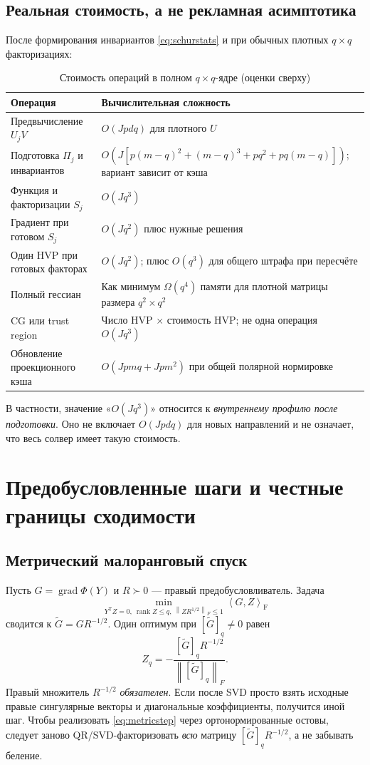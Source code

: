 \documentclass[10.5pt,a4paper]{article}
\newcommand{\T}{^{\mathsf T}}
\newcommand{\norm}[1]{\left\|#1\right\|}
\newcommand{\inn}[2]{\left\langle #1,#2\right\rangle_{\mathrm F}}
\DeclareMathOperator{\rank}{rank}
\DeclareMathOperator{\grad}{grad}
\numberwithin{equation}{section}
\theoremstyle{plain}
\theoremstyle{definition}
\begin{document}
\subsection{Реальная стоимость, а не рекламная асимптотика}
После формирования инвариантов \eqref{eq:schurstats} и при обычных плотных $q\times q$ факторизациях:
\begin{table}[ht]
\centering\small
\caption{Стоимость операций в полном $q\times q$-ядре (оценки сверху)}
\begin{tabularx}{\linewidth}{@{}L P{48mm}@{}}\toprule
Операция & Вычислительная сложность\\\midrule
Предвычисление $U_jV$ & $O(Jpdq)$ для плотного $U$\\
Подготовка $\Pi_j$ и инвариантов & $O(J[p(m-q)^2+(m-q)^3+pq^2+pq(m-q)])$; вариант зависит от кэша\\
Функция и факторизации $S_j$ & $O(Jq^3)$\\
Градиент при готовом $S_j$ & $O(Jq^2)$ плюс нужные решения\\
Один HVP при готовых факторах & $O(Jq^2)$; плюс $O(q^3)$ для общего штрафа при пересчёте\\
Полный гессиан & Как минимум $\Omega(q^4)$ памяти для плотной матрицы размера $q^2\times q^2$\\
CG или trust region & Число HVP $\times$ стоимость HVP; не одна операция $O(Jq^3)$\\
Обновление проекционного кэша & $O(Jpmq+Jpm^2)$ при общей полярной нормировке\\
\bottomrule\end{tabularx}
\label{tab:costs}
\end{table}
В частности, значение «$O(Jq^3)$» относится к \emph{внутреннему профилю после подготовки}. Оно не включает $O(Jpdq)$ для новых направлений и не означает, что весь солвер имеет такую стоимость.

\section{Предобусловленные шаги и честные границы сходимости}
\subsection{Метрический малоранговый спуск}
Пусть $G=\grad\Phi(Y)$ и $R\succ0$ --- правый предобусловливатель. Задача
\begin{equation}
 \min_{Y\T Z=0,\ \rank Z\le q,\ \norm{ZR^{1/2}}_F\le1}\inn{G}{Z}
 \label{eq:metric}
\end{equation}
сводится к $\widetilde G=GR^{-1/2}$. Один оптимум при $[\widetilde G]_q\ne0$ равен
\begin{equation}
 Z_q=-\frac{[\widetilde G]_q R^{-1/2}}{\norm{[\widetilde G]_q}_F}.
 \label{eq:metricstep}
\end{equation}
Правый множитель $R^{-1/2}$ \emph{обязателен}. Если после SVD просто взять исходные правые сингулярные векторы и диагональные коэффициенты, получится иной шаг. Чтобы реализовать \eqref{eq:metricstep} через ортонормированные остовы, следует заново QR/SVD-факторизовать \emph{всю} матрицу $[\widetilde G]_qR^{-1/2}$, а не забывать беление.
\end{document}

